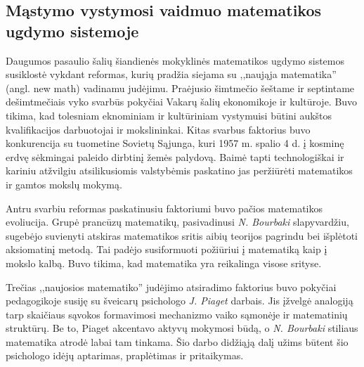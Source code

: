 \documentclass{article}
\begin{document}
\subsection{Mąstymo vystymosi vaidmuo matematikos ugdymo sistemoje}

Daugumos pasaulio šalių šiandienės mokyklinės matematikos ugdymo sistemos
susiklostė vykdant reformas, kurių pradžia siejama su ,,naująja matematika'' (angl. new math) vadinamu judėjimu. Praėjusio šimtmečio šeštame ir septintame dešimtmečiais vyko svarbūs pokyčiai Vakarų šalių ekonomikoje ir kultūroje. Buvo tikima, kad tolesniam eknominiam ir kultūriniam vystymuisi būtini aukštos kvalifikacijos darbuotojai ir mokslininkai. Kitas svarbus faktorius buvo konkurencija su tuometine Sovietų Sąjunga, kuri 1957 m. spalio 4 d. į kosminę erdvę sėkmingai paleido dirbtinį žemės palydovą. Baimė tapti technologiškai ir kariniu atžvilgiu atsilikusiomis valstybėmis paskatino jas peržiūrėti matematikos ir gamtos mokslų mokymą.

Antru svarbiu reformas paskatinusiu faktoriumi buvo pačios matematikos evoliucija. Grupė prancūzų matematikų, pasivadinusi
\textit{N. Bourbaki} slapyvardžiu, sugebėjo suvienyti atskiras matematikos sritis aibių teorijos pagrindu bei išplėtoti aksiomatinį metodą. Tai padėjo susiformuoti požiūriui į matematiką kaip į mokslo kalbą. Buvo tikima, kad matematika yra reikalinga visose srityse.

Trečias ,,naujosios matematiko'' judėjimo atsiradimo faktorius buvo pokyčiai pedagogikoje susiję su šveicarų psichologo
\textit{J. Piaget} darbais.  Jis įžvelgė analogiją tarp skaičiaus sąvokos formavimosi mechanizmo vaiko sąmonėje ir matematinių struktūrų.  Be to, Piaget akcentavo aktyvų mokymosi būdą, o \textit{N. Bourbaki} stiliaus matematika atrodė labai tam tinkama.
Šio darbo didžiąją dalį užims būtent šio psichologo idėjų aptarimas, praplėtimas ir pritaikymas.
\end{document}
